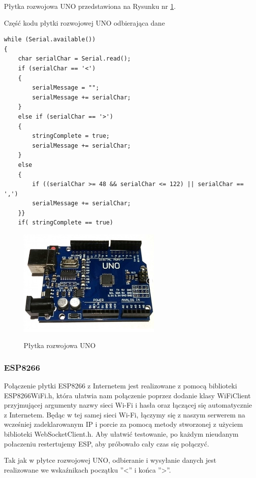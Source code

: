 \documentclass[12pt]{article}
\begin{document}
Płytka rozwojowa UNO przedstawiona na Rysunku nr \ref{fig:uno}.
\begin{spverbatim}
	Część kodu płytki rozwojowej UNO odbierająca dane
\end{spverbatim}
\begin{lstlisting}
while (Serial.available()) 
{
	char serialChar = Serial.read(); 
	if (serialChar == '<')  
	{
		serialMessage = "";
		serialMessage += serialChar;
	}
	else if (serialChar == '>')
	{
		stringComplete = true;
		serialMessage += serialChar;
	}
	else
	{ 
		if ((serialChar >= 48 && serialChar <= 122) || serialChar == ',') 
		serialMessage += serialChar;
	}}
	if( stringComplete == true)
\end{lstlisting}


\begin{figure}[!h]
	\begin{center}
		{\includegraphics[width=7cm]{uno_photo.png}}
	\end{center}
	\caption{Płytka rozwojowa UNO}
	\label{fig:uno}
\end{figure}

\newpage
\subsubsection{ESP8266}
Połączenie płytki ESP8266 z Internetem jest realizowane z pomocą biblioteki ESP8266WiFi.h, która ułatwia nam połączenie poprzez dodanie klasy WiFiClient przyjmującej argumenty nazwy sieci Wi-Fi i hasła oraz łączącej się automatycznie z Internetem.
Będąc w tej samej sieci Wi-Fi, łączymy się z naszym serwerem na wcześniej zadeklarowanym IP i porcie za pomocą metody stworzonej z użyciem biblioteki WebSocketClient.h.
Aby ułatwić testowanie, po każdym nieudanym połaczeniu restertujemy ESP, aby próbowało cały czas się połączyć.

Tak jak w płytce rozwojowej UNO, odbieranie i wysyłanie danych jest realizowane we wskaźnikach początku ''<'' i końca ''>''.
\end{document}
